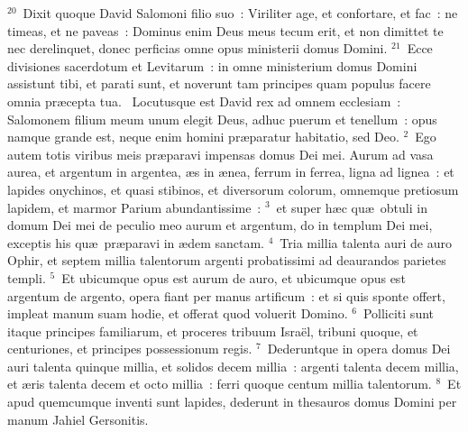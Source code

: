 ${}^{20}$~Dixit quoque David Salomoni filio suo~: Viriliter age, et confortare, et fac~: ne timeas, et ne paveas~: Dominus enim Deus meus tecum erit, et non dimittet te nec derelinquet, donec perficias omne opus ministerii domus Domini.
${}^{21}$~Ecce divisiones sacerdotum et Levitarum~: in omne ministerium domus Domini assistunt tibi, et parati sunt, et noverunt tam principes quam populus facere omnia pr\ae cepta tua.
~\lettrine[lines=10,image=true,loversize=0.05,lraise=-0.03]{L}{}ocutusque est David rex ad omnem ecclesiam~: Salomonem filium meum unum elegit Deus, adhuc puerum et tenellum~: opus namque grande est, neque enim homini pr\ae paratur habitatio, sed Deo.
${}^{2}$~Ego autem totis viribus meis pr\ae paravi impensas domus Dei mei. Aurum ad vasa aurea, et argentum in argentea, \ae s in \ae nea, ferrum in ferrea, ligna ad lignea~: et lapides onychinos, et quasi stibinos, et diversorum colorum, omnemque pretiosum lapidem, et marmor Parium abundantissime~:
${}^{3}$~et super h\ae c qu\ae\ obtuli in domum Dei mei de peculio meo aurum et argentum, do in templum Dei mei, exceptis his qu\ae\ pr\ae paravi in \ae dem sanctam.
${}^{4}$~Tria millia talenta auri de auro Ophir, et septem millia talentorum argenti probatissimi ad deaurandos parietes templi.
${}^{5}$~Et ubicumque opus est aurum de auro, et ubicumque opus est argentum de argento, opera fiant per manus artificum~: et si quis sponte offert, impleat manum suam hodie, et offerat quod voluerit Domino.
${}^{6}$~Polliciti sunt itaque principes familiarum, et proceres tribuum Isra\"el, tribuni quoque, et centuriones, et principes possessionum regis.
${}^{7}$~Dederuntque in opera domus Dei auri talenta quinque millia, et solidos decem millia~: argenti talenta decem millia, et \ae ris talenta decem et octo millia~: ferri quoque centum millia talentorum.
${}^{8}$~Et apud quemcumque inventi sunt lapides, dederunt in thesauros domus Domini per manum Jahiel Gersonitis.


